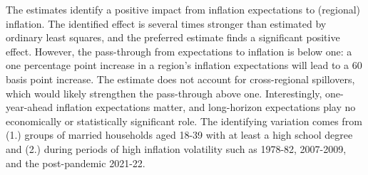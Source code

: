 \documentclass[12pt]{article}
\begin{document}
The estimates identify a positive impact from inflation expectations to (regional) inflation. The identified effect is several times stronger than estimated by ordinary least squares, and the preferred estimate finds a significant positive effect. However, the pass-through from expectations to inflation is below one: a one percentage point increase in a region's inflation expectations will lead to a 60 basis point increase. The estimate does not account for cross-regional spillovers, which would likely strengthen the pass-through above one. Interestingly, one-year-ahead inflation expectations matter, and long-horizon expectations play no economically or statistically significant role. The identifying variation comes from (1.) groups of married households aged 18-39 with at least a high school degree and (2.) during periods of high inflation volatility such as 1978-82, 2007-2009, and the post-pandemic 2021-22.

\pagebreak




%


\end{document}
